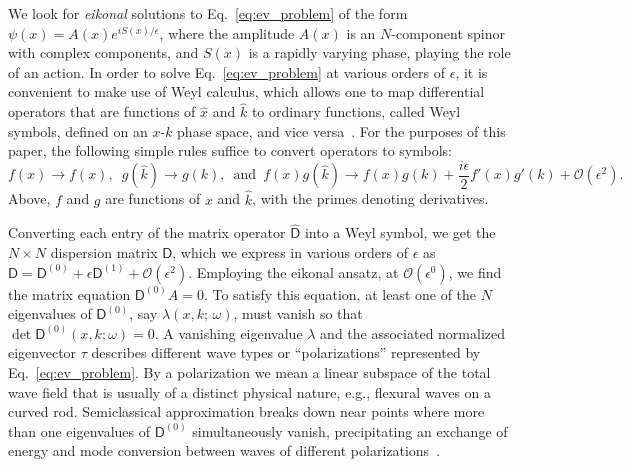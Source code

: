 We look for \emph{eikonal} solutions to Eq.~\eqref{eq:ev_problem} of the form $\psi(x) = A(x)e^{iS(x)/\epsilon}$, where the amplitude $A(x)$ is an $N$-component spinor with complex components, and $S(x)$ is a rapidly varying phase, playing the role of an action.
In order to solve Eq.~\eqref{eq:ev_problem} at various orders of $\epsilon$, it is convenient to make use of Weyl calculus, which allows one to map differential operators that are functions of $\hat{x}$ and $\hat{k}$ to ordinary functions, called Weyl symbols, defined on an $x$-$k$ phase space, and vice versa~\cite{chaichian2001,cohen2012}.
For the purposes of this paper, the following simple rules suffice to convert operators to symbols:
%
\begin{equation}
  f(x) \to f(x),\enspace
  g(\hat{k}) \to g(k),\enspace\text{and}\enspace
  f(x)g(\hat{k}) \to f(x)g(k) + \frac{i\epsilon}{2}f'(x)g'(k) + \mathcal{O}(\epsilon^{2}).
  \label{eq:weylrules}
\end{equation}
%
Above, $f$ and $g$ are functions of $x$ and $\hat{k}$, with the primes denoting derivatives.

Converting each entry of the matrix operator $\widehat{\mathsf{D}}$ into a Weyl symbol, we get the $N\times N$ dispersion matrix $\mathsf{D}$, which we express in various orders of $\epsilon$ as $\mathsf{D} = \mathsf{D}^{(0)} + \epsilon\mathsf{D}^{(1)} + \mathcal{O}(\epsilon^{2})$.
Employing the eikonal ansatz, at $\mathcal{O}(\epsilon^{0})$, we find the matrix equation $\mathsf{D}^{(0)}A = 0$.
To satisfy this equation, at least one of the $N$ eigenvalues of $\mathsf{D}^{(0)}$, say $\lambda(x, k;\, \omega)$, must vanish so that $\det \mathsf{D}^{(0)}(x, k; \omega) = 0$.
A vanishing eigenvalue $\lambda$ and the associated normalized eigenvector $\tau$ describes different wave types or ``polarizations'' represented by Eq.~\eqref{eq:ev_problem}.
By a polarization we mean a linear subspace of the total wave field that is usually of a distinct physical nature, e.g., flexural waves on a curved rod.
Semiclassical approximation breaks down near points where more than one eigenvalues of $\mathsf{D}^{(0)}$ simultaneously vanish, precipitating an exchange of energy and mode conversion between waves of different polarizations~\cite{tracy2014}.

